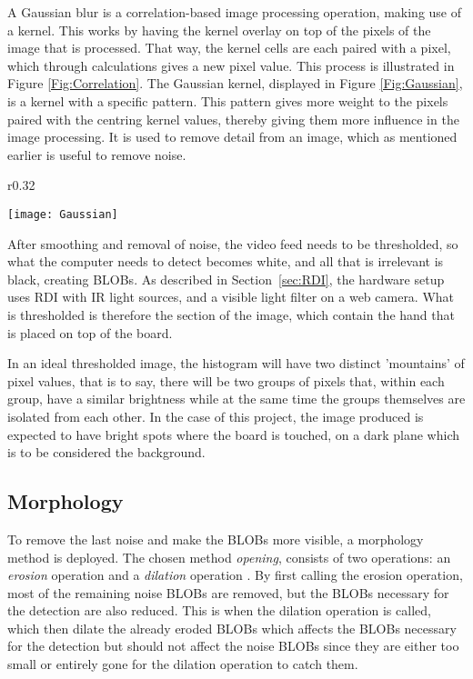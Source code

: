 A Gaussian blur is a correlation-based image processing operation, making use of a kernel. This works by having the kernel overlay on top of the pixels of the image that is processed. That way, the kernel cells are each paired with a pixel, which through calculations gives a new pixel value. This process is illustrated in Figure \ref{Fig:Correlation}. The Gaussian kernel, displayed in Figure \ref{Fig:Gaussian}, is a kernel with a specific pattern. This pattern gives more weight to the pixels paired with the centring kernel values, thereby giving them more influence in the image processing. It is used to remove detail from an image, which as mentioned earlier is useful to remove noise.

\begin{wrapfigure}{r}{0.32\textwidth}
\begin{center}
 \texttt{[image: Gaussian]}
  \end{center}
\caption{A 5x5 Gaussian kernel pattern \label{Fig:Gaussian}\citep{moeslund_introduction_2012}}
\end{wrapfigure}

After smoothing and removal of noise, the video feed needs to be thresholded, so what the computer needs to detect becomes white, and all that is irrelevant is black, creating BLOBs. As described in Section~\ref{sec:RDI}, the hardware setup uses RDI with IR light sources, and a visible light filter on a web camera. What is thresholded is therefore the section of the image, which contain the hand that is placed on top of the board.
 
In an ideal thresholded image, the histogram will have two distinct 'mountains' of pixel values, that is to say, there will be two groups of pixels that, within each group, have a similar brightness while at the same time the groups themselves are isolated from each other. In the case of this project, the image produced is expected to have bright spots where the board is touched, on a dark plane which is to be considered the background.
 
\subsection{Morphology}
To remove the last noise and make the BLOBs more visible, a morphology method is deployed. The chosen method \textit{opening}, consists of two operations: an \textit{erosion} operation and a \textit{dilation} operation \citep{moeslund_introduction_2012}. By first calling the erosion operation, most of the remaining noise BLOBs are removed, but the BLOBs necessary for the detection are also reduced. This is when the dilation operation is called, which then dilate the already eroded BLOBs which affects the BLOBs necessary for the detection but should not affect the noise BLOBs since they are either too small or entirely gone for the dilation operation to catch them.
 
